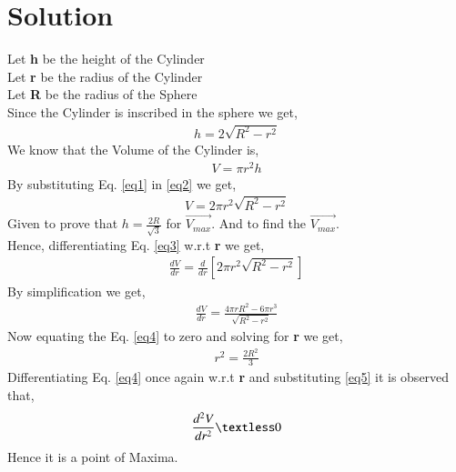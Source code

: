 \documentclass[journal,12pt,twocolumn]{IEEEtran}
\begin{document}
\section{Solution}
\vspace{0.25cm} 
\raggedright
Let \textbf{h} be the height of the Cylinder\\
\vspace{0.2cm}
Let \textbf{r} be the radius of the Cylinder\\
\vspace{0.2cm}
Let \textbf{R} be the radius of the Sphere\\ 
\vspace{0.2cm}
Since the Cylinder is inscribed in the sphere we get,
\begin{align}
h = 2\sqrt{R^2 - r^2}
\label{eq1}
\end{align}
We know that the Volume of the Cylinder is,
\begin{align}
V = \pi r^2 h
\label{eq2}
\end{align}
By substituting Eq. \eqref{eq1} in \eqref{eq2} we get,
\begin{align}
V = 2 \pi r^2 \sqrt{R^2 - r ^2}
\label{eq3}
\end{align}
Given to prove that $ h = \frac{2R}{\sqrt{3}} $ for $\vec{V_{max}}$. And to find the $\vec{V_{max}}$.\\
\vspace{0.25cm}
Hence, differentiating Eq. \eqref{eq3} w.r.t \textbf{r} we get,\\
\begin{align*}
\frac{dV}{dr} = \frac{d}{dr} [ 2 \pi r^2 \sqrt{R^2 - r ^2} ]
\end{align*}
By simplification we get,\\
\begin{align}
\frac{dV}{dr} = \frac{4 \pi r R^2 - 6 \pi r^3}{\sqrt{R^2 - r^2}}
\label{eq4} 
\end{align}
Now equating the Eq. \eqref{eq4} to zero and solving for \textbf{r} we get,\\
\begin{align}
r^2 = \frac{2R^2}{3}
\label{eq5}
\end{align}
Differentiating Eq. \eqref{eq4} once again w.r.t \textbf{r} and substituting \eqref{eq5} it is observed that,
\begin{align}
\frac{d^2V}{dr^2} \textless 0
\end{align}
Hence it is a point of Maxima.\\
\vspace{0.2cm}
\end{document}
